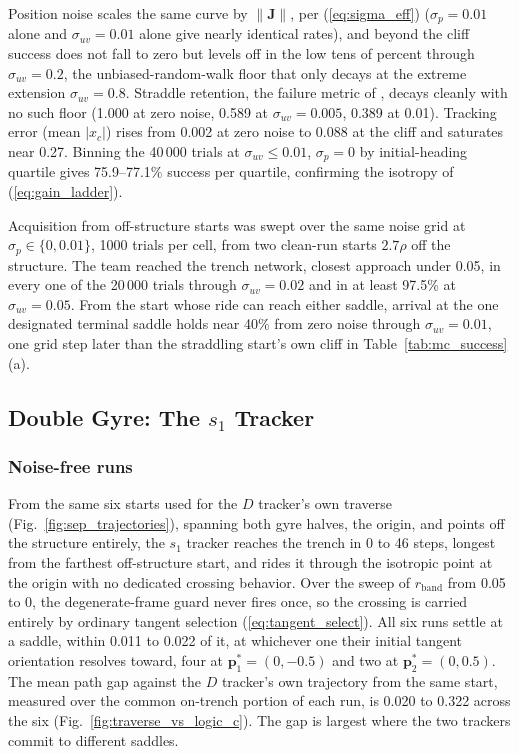 \documentclass[lettersize,journal]{IEEEtran}
\begin{document}
Position noise
scales the same curve by $\|\mathbf{J}\|$, per (\ref{eq:sigma_eff})
($\sigma_p = 0.01$ alone and
$\sigma_{uv} = 0.01$ alone give nearly identical rates), and beyond the
cliff success does not fall to zero but levels off in the low tens of
percent through $\sigma_{uv} = 0.2$, the unbiased-random-walk floor
that only decays at the extreme extension $\sigma_{uv} = 0.8$.
Straddle retention, the failure metric of \cite{17}, decays cleanly with
no such floor (1.000 at zero noise, 0.589 at $\sigma_{uv} = 0.005$,
0.389 at 0.01). Tracking error (mean $|x_c|$) rises from 0.002 at
zero noise to 0.088 at the cliff and saturates near 0.27. Binning
the 40\,000 trials at $\sigma_{uv} \leq 0.01$, $\sigma_p = 0$ by
initial-heading quartile gives 75.9--77.1\% success per quartile,
confirming the isotropy of (\ref{eq:gain_ladder}).

Acquisition from off-structure starts was swept over the same noise
grid at $\sigma_p \in \{0, 0.01\}$, 1000 trials per cell, from two
clean-run starts $2.7\rho$ off the structure. The team reached the
trench network, closest approach under 0.05, in every one of the
20\,000 trials through $\sigma_{uv} = 0.02$ and in at least 97.5\% at
$\sigma_{uv} = 0.05$. From the start whose ride can reach either
saddle, arrival at the one designated terminal saddle holds near 40\%
from zero noise through $\sigma_{uv} = 0.01$, one grid step later than
the straddling start's own cliff in Table~\ref{tab:mc_success}(a).

\subsection{Double Gyre: The $s_1$ Tracker}
\label{sec:results_oecs}

\subsubsection{Noise-free runs}
From the same six starts used for the $D$ tracker's own traverse
(Fig.~\ref{fig:sep_trajectories}), spanning both gyre halves, the
origin, and points off the structure entirely, the $s_1$ tracker reaches
the trench in 0 to 46 steps, longest from the farthest off-structure
start, and rides it through the isotropic point at the origin with no
dedicated crossing behavior. Over the sweep of $r_{\text{band}}$ from
0.05 to 0, the degenerate-frame
guard never fires once, so the
crossing is carried entirely by ordinary tangent selection
(\ref{eq:tangent_select}). All six runs settle at a saddle, within
0.011 to 0.022 of it, at whichever one their initial tangent
orientation resolves toward, four at $\mathbf{p}^*_1 = (0, -0.5)$ and
two at $\mathbf{p}^*_2 = (0, 0.5)$. The mean
path gap against the $D$ tracker's own trajectory from the same start,
measured over the common on-trench portion of each run, is 0.020 to
0.322 across the six (Fig.~\ref{fig:traverse_vs_logic_c}). The gap is
largest where the two trackers commit to different saddles.
\end{document}
